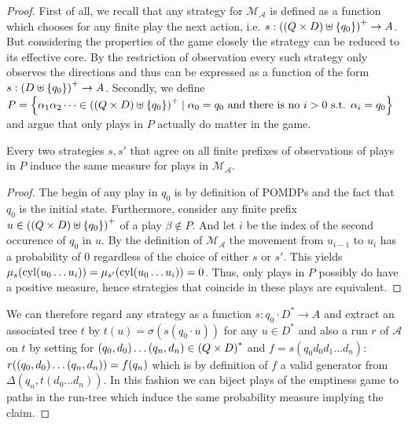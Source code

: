 \begin{proof}
  First of all, we recall that any strategy for $\mathcal{M}_{\mathcal{A}}$ is
  defined as a function which chooses for any finite play the next action, i.e.
  $s:\left(\left(Q\times D\right)\uplus\left\{q_{0}\right\}\right)^{+}\rightarrow A$. But
  considering the properties of the game closely the strategy can be reduced to
  its effective core. By the restriction of observation every such strategy
  only observes the directions and thus can be expressed as a function of the
  form $s:\left(D\uplus\left\{q_{0}\right\}\right)^{+}\rightarrow A$. Secondly, we define
  $P = \left\{\alpha_{1}\alpha_{2}\dots\in\left(\left(Q\times D\right)\uplus
  \left\{q_{0}\right\}\right)^{+}\mid \alpha_{0} = q_{0}\text{ and there is no }i>0
  \text{ s.t. }\alpha_{i} =q_{0}\right\}$
  and argue that only plays in $P$ actually do matter in the game.
  \begin{lemma}
    Every two strategies $s,s'$ that agree on all finite prefixes of
    observations of plays in $P$ induce the same measure for plays in
    $\mathcal{M}_{\mathcal{A}}$.
  \end{lemma}
  \begin{proof}
    The begin of any play in $q_{0}$ is by definition of \acp{POMDP} and the
    fact that $q_{0}$ is the initial state. Furthermore, consider any finite
    prefix $u\in\left(\left(Q\times D\right)\uplus \left\{q_{0}\right\}\right)^{+}$ of a play
    $\beta\notin P$. And let $i$ be the index of the second occurence of
    $q_{0}$ in $u$. By the definition of $\mathcal{M}_{\mathcal{A}}$ the
    movement from $u_{i-1}$ to $u_{i}$ has a probability of $0$ regardless of
    the choice of either $s$ or $s'$. This yields
    $\mu_{s}(\operatorname{cyl}(u_{0}\dots u_{i})) = \mu_{s'}(\operatorname{cyl}(u_{0}\dots u_{i})) = 0$.
    Thus, only plays in $P$ possibly do have a positive measure, hence
    strategies that coincide in these plays are equivalent.
  \end{proof}
  We can therefore regard any strategy as a function
  $s:q_{0}\cdot D^{*}\rightarrow A$ and extract an associated tree $t$ by
  $t(u) = \sigma(s(q_{0}\cdot u))$ for any $u\in D^{*}$ and also a run $r$ of
  $\mathcal{A}$ on $t$ by setting for
  $\left(q_{0}, d_{0}\right)\dots\left(q_{n}, d_{n}\right)\in\left(Q\times D\right)^{*}$ and
  $f = s(q_{0}d_{0}d_{1}\dots d_{n})$:
  $r(\left(q_{0}, d_{0}\right)\dots\left(q_{n}, d_{n}\right)) = f(q_{n})$ which is by
  definition of $f$ a valid generator from $\Delta(q_{n}, t(d_{0}\dots d_{n}))$.
  In this fashion we can biject plays of the emptiness game to paths in the
  run-tree which induce the same probability measure implying the claim.
\end{proof}
